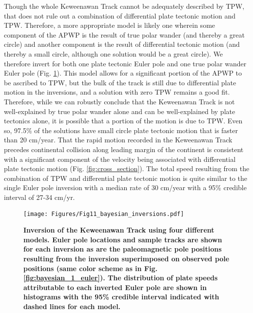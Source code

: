 \documentclass[11pt,letterpaper]{article}
\begin{document}
Though the whole Keweenawan Track cannot be adequately described by TPW, that does not rule out a combination of differential plate tectonic motion and TPW. Therefore, a more appropriate model is likely one wherein some component of the APWP is the result of true polar wander (and thereby a great circle) and another component is the result of differential tectonic motion (and thereby a small circle, although one solution would be a great circle). We therefore invert for both one plate tectonic Euler pole and one true polar wander Euler pole (Fig. \ref{fig:bayesian_results}). This model allows for a significant portion of the APWP to be ascribed to TPW, but the bulk of the track is still due to differential plate motion in the inversions, and a solution with zero TPW remains a good fit.  Therefore, while we can robustly conclude that the Keweenawan Track is not well-explained by true polar wander alone and can be well-explained by plate tectonics alone, it is possible that a portion of the motion is due to TPW. Even so, 97.5$\%$ of the solutions have small circle plate tectonic motion that is faster than 20 cm/year. That the rapid motion recorded in the Keweenawan Track precedes continental collision along leading margin of the continent is consistent with a significant component of the velocity being associated with differential plate tectonic motion (Fig. \ref{fig:cross_section}). The total speed resulting from the combination of TPW and differential plate tectonic motion is quite similar to the single Euler pole inversion with a median rate of 30 cm/year with a 95$\%$ credible interval of 27-34 cm/yr.

\begin{figure}
\begin{centering}
\texttt{[image: Figures/Fig11\_bayesian\_inversions.pdf]}

\caption{\small{\textbf{Inversion of the Keweenawan Track using four different models. Euler pole locations and sample tracks are shown for each inversion as are the paleomagnetic pole positions resulting from the inversion superimposed on observed pole positions (same color scheme as in Fig. \ref{fig:bayesian_1_euler}). The distribution of plate speeds attributable to each inverted Euler pole are shown in histograms with the 95\% credible interval indicated with dashed lines for each model.}}}
\label{fig:bayesian_results}
\end{centering}
\end{figure}
\end{document}
